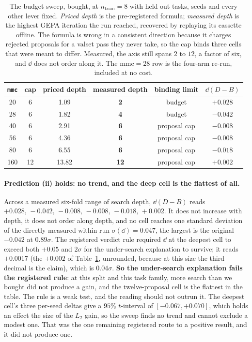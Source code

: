 \documentclass[11pt]{article}
\begin{document}
\begin{table}[h]
\centering
\small
\begin{tabular}{cccccc}
\toprule
\texttt{mmc} & cap & priced depth & \textbf{measured depth} & binding limit & $\dd(D-B)$ \\
\midrule
20  & 6  & 1.09  & \textbf{2}  & budget        & $+0.028$ \\
28  & 6  & 1.82  & \textbf{4}  & budget        & $-0.042$ \\
40  & 6  & 2.91  & \textbf{6}  & proposal cap  & $-0.008$ \\
56  & 6  & 4.36  & \textbf{6}  & proposal cap  & $-0.008$ \\
80  & 6  & 6.55  & \textbf{6}  & proposal cap  & $-0.018$ \\
160 & 12 & 13.82 & \textbf{12} & proposal cap  & $+0.002$ \\
\bottomrule
\end{tabular}
\caption{The budget sweep, bought, at $n_{\mathrm{train}}=8$ with held-out tasks, seeds and every
other lever fixed. \emph{Priced depth} is the pre-registered formula; \emph{measured depth} is the
highest GEPA iteration the run reached, recovered by replaying its cassette offline. The
formula is wrong in a consistent direction because it charges rejected proposals for a valset pass
they never take, so the cap binds three cells that were meant to differ. Measured, the axis still
spans $2$ to $12$, a factor of six, and $\dd$ does not order along it. The
$\mathrm{mmc}=28$ row is the four-arm re-run, included at no cost.}
\label{tab:budgetresult}
\end{table}

\paragraph{Prediction (ii) holds: no trend, and the deep cell is the flattest of all.} Across a
measured six-fold range of search depth, $\dd(D-B)$ reads
$+0.028,\,-0.042,\,-0.008,\,-0.008,\,-0.018,\,+0.002$. It does not increase with depth, it does
not order along depth, and no cell reaches one standard deviation of the directly measured
within-run $\sigma(\dd) = 0.047$, the largest is the original $-0.042$ at $0.89\sigma$. The registered
verdict rule required $\dd$ at the deepest cell to exceed both $+0.05$ and $2\sigma$ for the
under-search explanation to survive; it reads $+0.0017$ (the $+0.002$ of
Table~\ref{tab:budgetresult}, unrounded, because at this size the third decimal is the claim),
which is $0.04\sigma$. \textbf{So the under-search explanation fails the registered rule}: at this
split and this task family, more search than we bought did not produce a gain, and the
twelve-proposal cell is the flattest in the table. The rule is a weak test, and the reading
should not outrun it. The deepest cell's three per-seed deltas give a $95\%$ $t$-interval of
$[-0.067,+0.070]$, which holds an effect the size of the $L_2$ gain, so the sweep finds no trend
and cannot exclude a modest one. That was the one remaining registered route to a positive
result, and it did not produce one.
\end{document}
